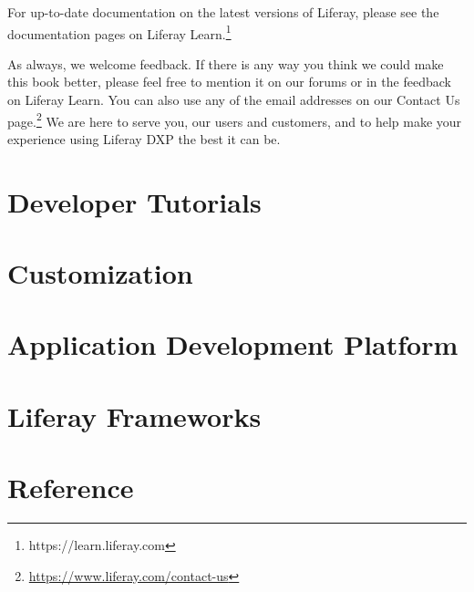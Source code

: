 \documentclass[11pt,openright,twoside]{memoir}
\begin{document}
For up-to-date documentation on the latest versions of Liferay, please see the documentation pages on Liferay Learn.\footnote{https://learn.liferay.com} 

As always, we welcome feedback. If there is any way you think we could make this book better, please feel free to mention it on our forums or in the feedback on Liferay Learn. You can also use any of the email addresses on our Contact Us page.\footnote{\href{http://www.liferay.com/contact-us}{https://www.liferay.com/contact-us}} We are here to serve you, our users and customers, and to help make your experience using Liferay DXP the best it can be.

\mainmatter

\part{Developer Tutorials}



\part{Customization} 



\part{Application Development Platform}



\part{Liferay Frameworks} 



\part{Reference}


\end{document}
